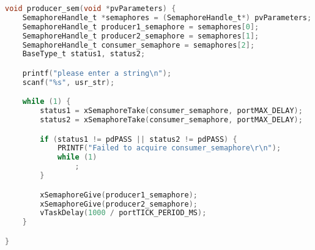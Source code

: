 \begin{lstlisting}[language=c,caption=Problem 3 Producer Task, label=list:p3_prod]
void producer_sem(void *pvParameters) {
    SemaphoreHandle_t *semaphores = (SemaphoreHandle_t*) pvParameters;
    SemaphoreHandle_t producer1_semaphore = semaphores[0];
    SemaphoreHandle_t producer2_semaphore = semaphores[1];
    SemaphoreHandle_t consumer_semaphore = semaphores[2];
    BaseType_t status1, status2;

    printf("please enter a string\n");
    scanf("%s", usr_str);

    while (1) {
        status1 = xSemaphoreTake(consumer_semaphore, portMAX_DELAY);
        status2 = xSemaphoreTake(consumer_semaphore, portMAX_DELAY);

        if (status1 != pdPASS || status2 != pdPASS) {
            PRINTF("Failed to acquire consumer_semaphore\r\n");
            while (1)
                ;
        }

        xSemaphoreGive(producer1_semaphore);
        xSemaphoreGive(producer2_semaphore);
        vTaskDelay(1000 / portTICK_PERIOD_MS);
    }

}
\end{lstlisting}
